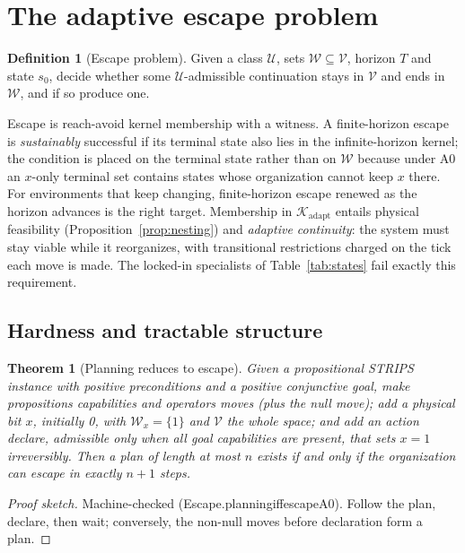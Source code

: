 \documentclass[11pt]{article}
\theoremstyle{plain}
\newtheorem{theorem}{Theorem}
\theoremstyle{definition}
\newtheorem{definition}{Definition}
\newcommand{\K}{\mathcal{K}}
\newcommand{\V}{\mathcal{V}}
\newcommand{\W}{\mathcal{W}}
\newcommand{\U}{\mathcal{U}}
\newcommand{\adapt}{\mathrm{adapt}}
\newcommand{\lean}[1]{{\ttfamily\renewcommand{\_}{\textunderscore\allowbreak}#1}}
\begin{document}
\section{The adaptive escape problem}
\label{sec:escape}

\begin{definition}[Escape problem]
Given a class $\U$, sets $\W\subseteq\V$, horizon $T$ and state $s_0$, decide whether some $\U$-admissible continuation stays in $\V$ and ends in $\W$, and if so produce one.
\end{definition}

Escape is reach-avoid kernel membership with a witness. A finite-horizon escape is \emph{sustainably} successful if its terminal state also lies in the infinite-horizon kernel; the condition is placed on the terminal state rather than on $\W$ because under A0 an $x$-only terminal set contains states whose organization cannot keep $x$ there. For environments that keep changing, finite-horizon escape renewed as the horizon advances is the right target. Membership in $\K_\adapt$ entails physical feasibility (Proposition~\ref{prop:nesting}) and \emph{adaptive continuity}: the system must stay viable while it reorganizes, with transitional restrictions charged on the tick each move is made. The locked-in specialists of Table~\ref{tab:states} fail exactly this requirement.

\subsection{Hardness and tractable structure}

\begin{theorem}[Planning reduces to escape]\label{thm:escape}
Given a propositional STRIPS instance with positive preconditions and a positive conjunctive goal, make propositions capabilities and operators moves (plus the null move); add a physical bit $x$, initially 0, with $\W_x=\{1\}$ and $\V$ the whole space; and add an action \emph{declare}, admissible only when all goal capabilities are present, that sets $x=1$ irreversibly. Then a plan of length at most $n$ exists if and only if the organization can escape in exactly $n+1$ steps.
\end{theorem}
\begin{proof}[Proof sketch]
Machine-checked (\lean{Escape.planning\_iff\_escape\_A0}). Follow the plan, declare, then wait; conversely, the non-null moves before declaration form a plan.
\end{proof}
\end{document}
